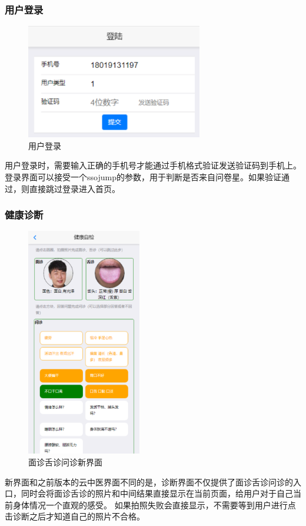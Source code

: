 \subsubsection{用户登录}
\begin{figure}[ht]
    \centering
    \includegraphics[height=5cm]{images/login.png}
    \caption{用户登录}
    \label{fig:login}
\end{figure} 
用户登录时，需要输入正确的手机号才能通过手机格式验证发送验证码到手机上。登录界面可以接受一个ssojump的参数，用于判断是否来自问卷星。如果验证通过，则直接跳过登录进入首页。

\subsubsection{健康诊断}

\begin{figure}[h]
    \centering
    \includegraphics[height=10cm]{images/diag.png}
    \caption{面诊舌诊问诊新界面}
    \label{fig:diag_new}
\end{figure}

新界面和之前版本的云中医界面不同的是，诊断界面不仅提供了面诊舌诊问诊的入口，同时会将面诊舌诊的照片和中间结果直接显示在当前页面，给用户对于自己当前身体情况一个直观的感受。
如果拍照失败会直接显示，不需要等到用户进行点击诊断之后才知道自己的照片不合格。
    
